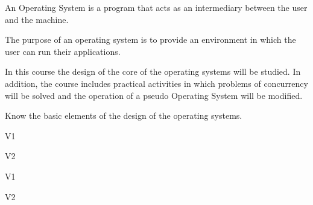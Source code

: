 \begin{syllabus}


\begin{justification}
An Operating System is a program that acts as an intermediary between the user and the machine.

The purpose of an operating system is to provide an environment in which the user can run their applications.

In this course the design of the core of the operating systems will be studied. 
In addition, the course includes practical activities in which problems of concurrency will be solved and the operation of a pseudo Operating System will be modified.
\end{justification}

\begin{goals}
	\item Know the basic elements of the design of the operating systems.
\end{goals}

\begin{outcomes}{V1}
    \item {}
\end{outcomes}

\begin{outcomes}{V2}
    \item {}
    \item {}
    \item {}
\end{outcomes}

\begin{competences}{V1}
    \item {}
    \item {}
    \item {}
\end{competences}

\begin{competences}{V2}
    \item {}
    \item {}
    \item {}
\end{competences}


\end{syllabus}
